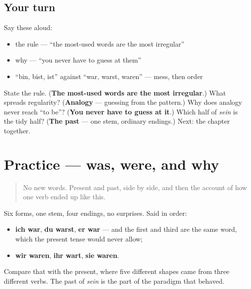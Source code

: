 \subsection*{Your turn}
Say these aloud:

\begin{itemize}
\raggedright
  \item the rule — \textquotedblleft{}the most-used words are the most irregular\textquotedblright{}
  \item why — \textquotedblleft{}you never have to guess at them\textquotedblright{}
  \item \textquotedblleft{}bin, bist, ist\textquotedblright{} against \textquotedblleft{}war, warst, waren\textquotedblright{} — mess, then order
\end{itemize}

\begin{tcolorbox}[breakable,colback=teal!4,colframe=teal!35!black,title={Before you move on}]
State the rule. (\textbf{The most-used words are the most irregular}.) What spreads regularity? (\textbf{Analogy} — guessing from the pattern.) Why does analogy never reach \textquotedblleft{}to be\textquotedblright{}? (\textbf{You never have to guess at it}.) Which half of \emph{sein} is the tidy half? (\textbf{The past} — one stem, ordinary endings.) Next: the chapter together.
\end{tcolorbox}
\section[Practice]{Practice — was, were, and why}

\label{lesson:GE-C16-war-practice}



\begin{quote}
No new words. Present and past, side by side, and then the account of how one verb ended up like this.
\end{quote}

\begin{grammarlens}[title={Grammar Lens: the past, assembled}]
Six forms, one stem, four endings, no surprises. Said in order:

\begin{itemize}
\raggedright
  \item \textbf{ich war}, \textbf{du warst}, \textbf{er war} — and the first and third are the same word, which the present tense would never allow;
  \item \textbf{wir waren}, \textbf{ihr wart}, \textbf{sie waren}.
\end{itemize}

Compare that with the present, where five different shapes came from three different verbs. The past of \emph{sein} is the part of the paradigm that behaved.
\end{grammarlens}

